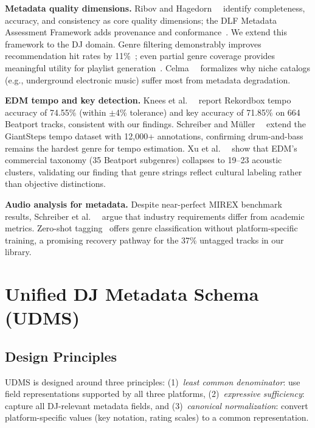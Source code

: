 \documentclass[letterpaper,10pt]{article}
\let\citep\cite  %
\begin{document}
\textbf{Metadata quality dimensions.} Ribov and Hagedorn~~\citep{ribov2022} identify completeness, accuracy, and consistency as core quality dimensions; the DLF Metadata Assessment Framework adds provenance and conformance~\citep{bruce2004metadata}. We extend this framework to the DJ domain. Genre filtering demonstrably improves recommendation hit rates by 11\%~\citep{bogdanov2011metadata}; even partial genre coverage provides meaningful utility for playlist generation~\citep{bogdanov2013semantics}. Celma~~\citep{celma2010longtail} formalizes why niche catalogs (e.g., underground electronic music) suffer most from metadata degradation.

\textbf{EDM tempo and key detection.} Knees et al.~~\citep{knees2015edmdatasets} report Rekordbox tempo accuracy of 74.55\% (within $\pm$4\% tolerance) and key accuracy of 71.85\% on 664 Beatport tracks, consistent with our findings. Schreiber and M\"uller~~\citep{schreiber2018crowdsourced} extend the GiantSteps tempo dataset with 12,000+ annotations, confirming drum-and-bass remains the hardest genre for tempo estimation. Xu et al.~~\citep{xu2025edmtaxonomy} show that EDM's commercial taxonomy (35 Beatport subgenres) collapses to 19--23 acoustic clusters, validating our finding that genre strings reflect cultural labeling rather than objective distinctions.

\textbf{Audio analysis for metadata.} Despite near-perfect MIREX benchmark results, Schreiber et al.~~\citep{schreiber2020tempo} argue that industry requirements differ from academic metrics. Zero-shot tagging~\citep{choi2019zeroshot} offers genre classification without platform-specific training, a promising recovery pathway for the 37\% untagged tracks in our library.

\section{Unified DJ Metadata Schema (UDMS)}

\subsection{Design Principles}

UDMS is designed around three principles: (1)~\emph{least common denominator}: use field representations supported by all three platforms, (2)~\emph{expressive sufficiency}: capture all DJ-relevant metadata fields, and (3)~\emph{canonical normalization}: convert platform-specific values (key notation, rating scales) to a common representation.
\end{document}
